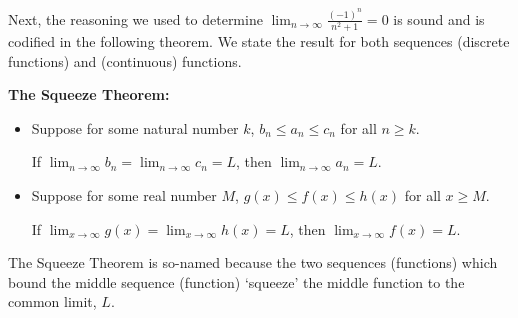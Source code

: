 \documentclass{ximera}
\begin{document}
Next, the reasoning we used to determine  $\lim_{n \rightarrow \infty} \frac{(-1)^{n}}{n^2 +1} = 0$ is sound and is codified in the following theorem. We state the result for both sequences (discrete functions) and (continuous) functions.






\begin{theorem} \label{squeezeth}  \textbf{The Squeeze Theorem:}  $~$

\begin{itemize}

\item Suppose for some natural number $k$, $b_{n} \leq a_{n} \leq c_{n}$ for all $n \geq k$.  

 

If $\lim_{n \rightarrow \infty} b_{n} = \lim_{n \rightarrow \infty} c_{n} = L$, then $\lim_{n \rightarrow \infty} a_{n} = L$.

\item Suppose for some real number $M$, $g(x) \leq f(x) \leq h(x)$ for all $x \geq M$.

 

If $\lim_{x \rightarrow \infty} g(x) = \lim_{x \rightarrow \infty} h(x) = L$, then $\lim_{x \rightarrow \infty} f(x)= L$.

\end{itemize}

\end{theorem}




The Squeeze Theorem is so-named because the two sequences (functions) which bound the middle sequence (function) `squeeze' the middle function to the common limit, $L$.

\begin{image}
\end{image}
\end{document}
